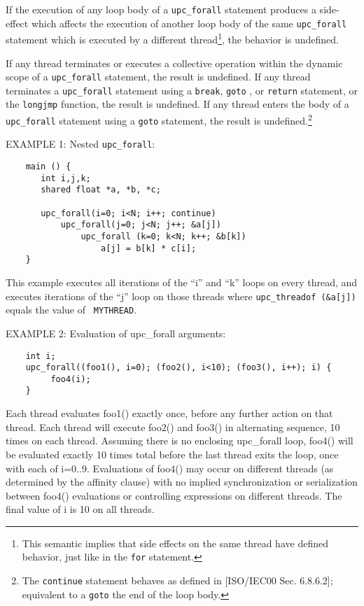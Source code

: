 \documentclass[12pt,titlepage]{article}
\newcounter{parnum}
\newcommand\np{\addtocounter{parnum}{1}\hspace{-2em}\makebox[2em][l]{\arabic{parnum}}}
\begin{document}
\np If the execution of any loop body of a {\tt upc\_forall} statement
    produces a side-effect which affects the execution of another loop
    body of the same {\tt upc\_forall} statement which is executed by a different
    thread\footnote{This semantic implies that side effects on the same thread 
    have defined behavior, just like in the {\tt for} statement.}, the behavior is
    undefined.

\np If any thread terminates or executes a collective operation
   within the dynamic scope of a {\tt upc\_forall}
   statement, the result is undefined. If any thread terminates
   a  {\tt upc\_forall}  statement using a {\tt break},
   {\tt goto} , or {\tt return} statement, or the {\tt longjmp} function,
   the result is undefined.
   If any thread enters the body of a {\tt upc\_forall} statement
   using a {\tt goto} statement, the result is undefined.\footnote{The
   {\tt continue} statement behaves as defined in [ISO/IEC00 Sec. 
   6.8.6.2]; equivalent to a {\tt goto} the end of the loop body.}

\np EXAMPLE 1: Nested {\tt upc\_forall}: 

\begin{verbatim}
    main () { 
       int i,j,k; 
       shared float *a, *b, *c; 
    
       upc_forall(i=0; i<N; i++; continue) 
           upc_forall(j=0; j<N; j++; &a[j]) 
               upc_forall (k=0; k<N; k++; &b[k]) 
                   a[j] = b[k] * c[i]; 
    } 
\end{verbatim}

   This example executes all iterations of the ``i'' and ``k'' loops
   on every thread, and executes iterations of the ``j'' loop on those
   threads where {\tt upc\_threadof (\&a[j])} equals the value of {\tt
   MYTHREAD}.
   
\np EXAMPLE 2: Evaluation of upc\_forall arguments:

\begin{verbatim}
    int i;
    upc_forall((foo1(), i=0); (foo2(), i<10); (foo3(), i++); i) {
         foo4(i);
    }
\end{verbatim}
   Each thread evaluates foo1() exactly once, before any further action on that
   thread. Each thread will execute foo2() and foo3() in alternating sequence, 
   10 times on each thread. Assuming there is no enclosing upc\_forall loop, 
   foo4() will be evaluated exactly 10 times total before the last thread exits the 
   loop, once with each of i=0..9. Evaluations of foo4() may occur on different 
   threads (as determined by the affinity clause) with no implied synchronization 
   or serialization between foo4() evaluations or controlling expressions on 
   different threads. The final value of i is 10 on all threads.
\end{document}
